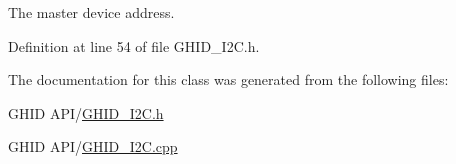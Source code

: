 \-The master device address. 



\-Definition at line 54 of file \-G\-H\-I\-D\-\_\-\-I2\-C.\-h.



\-The documentation for this class was generated from the following files\-:\begin{DoxyCompactItemize}
\item 
\-G\-H\-I\-D A\-P\-I/\hyperlink{_g_h_i_d___i2_c_8h}{\-G\-H\-I\-D\-\_\-\-I2\-C.\-h}\item 
\-G\-H\-I\-D A\-P\-I/\hyperlink{_g_h_i_d___i2_c_8cpp}{\-G\-H\-I\-D\-\_\-\-I2\-C.\-cpp}\end{DoxyCompactItemize}
